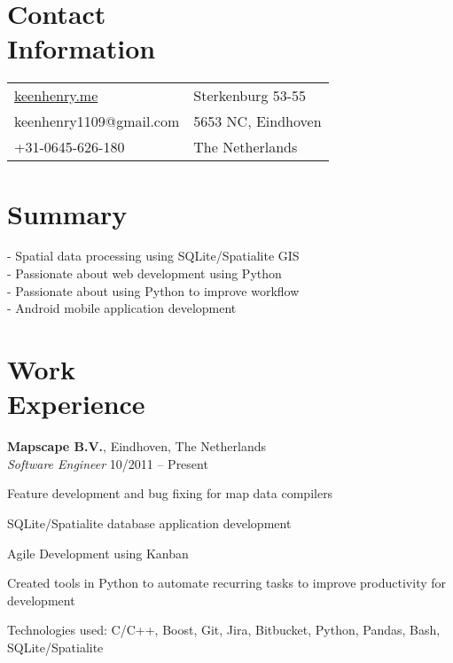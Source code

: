 \documentclass[margin,line]{resume}
\begin{document}
\begin{resume}

    \section{\myheadingstyle Contact \\ Information}
      \begin{tabular}{@{}p{7cm}p{6cm}}
      \url{keenhenry.me}      & Sterkenburg 53-55 \\
      keenhenry1109@gmail.com & 5653 NC, Eindhoven \\
      +31-0645-626-180        & The Netherlands \\
      \end{tabular}
 
    \section{\myheadingstyle Summary}
      - Spatial data processing using SQLite/Spatialite GIS \\
      - Passionate about web development using Python \\
      - Passionate about using Python to improve workflow \\
      - Android mobile application development \\
    \vspace{-5mm}

    \section{\myheadingstyle Work \\ Experience}

    \textbf{Mapscape B.V.}, Eindhoven, The Netherlands \\
    \textsl{Software Engineer} \hfill 10/2011 -- Present \vspace{-3mm}\\\vspace{-1mm}%
      \begin{list2}
      \item Feature development and bug fixing for map data compilers
      \item SQLite/Spatialite database application development
      \item Agile Development using Kanban
      \item Created tools in Python to automate recurring tasks to improve productivity for development
      \item Technologies used: C/C++, Boost, Git, Jira, Bitbucket, Python, Pandas, Bash, SQLite/Spatialite
      \end{list2}


\end{resume}
\end{document}

